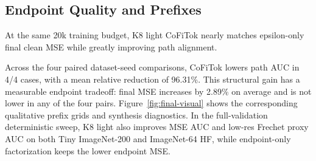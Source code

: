\documentclass[11pt]{article}
\newcommand{\method}{CoFiTok}
\begin{document}
\subsection{Endpoint Quality and Prefixes}

At the same 20k training budget, K8 light \method{} nearly matches epsilon-only
final clean MSE while greatly improving path alignment.

\begin{table}[t]
  \centering
  \caption{Matched 20k two-seed comparison (mean $\pm$ sample standard
  deviation over seeds 103 and 139). Lower is better for final clean MSE and
  path AUC; higher is better for effective token count.}
  \label{tab:fair20k}
  \small
\end{table}

Across the four paired dataset-seed comparisons, \method{} lowers path AUC in
4/4 cases, with a mean relative reduction of 96.31\%. This structural gain has
a measurable endpoint tradeoff: final MSE increases by 2.89\% on average and
is not lower in any of the four pairs. Figure~\ref{fig:final-visual} shows the
corresponding qualitative prefix grids and synthesis diagnostics.
In the full-validation deterministic sweep, K8 light also improves MSE AUC and
low-res Frechet proxy AUC on both Tiny ImageNet-200 and ImageNet-64 HF, while
endpoint-only factorization keeps the lower endpoint MSE.
\end{document}
